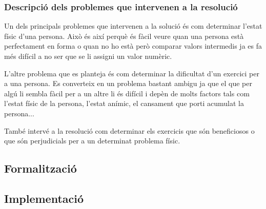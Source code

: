 \documentclass[a4paper, 12pt]{article}
\begin{document}
\subsubsection{Descripció dels problemes que intervenen a la resolució}

Un dels principals problemes que intervenen a la solució és com determinar l'estat físic d'una persona. Això és així perquè és fàcil veure quan una persona està perfectament en forma o quan no ho està però comparar valors intermedis ja es fa més difícil a no ser que se li assigni un valor numèric.

L'altre problema que es planteja és com determinar la dificultat d'un exercici per a una persona. Es converteix en un problema bastant ambigu ja que el que per algú li sembla fàcil per a un altre li és difícil i depèn de molts factors tals com l'estat físic de la persona, l'estat anímic, el cansament que porti acumulat la persona...

També intervé a la resolució com determinar els exercicis que són beneficiosos o que són perjudicials per a un determinat problema físic. 

\subsection{Formalització}

\subsection{Implementació}
\end{document}
